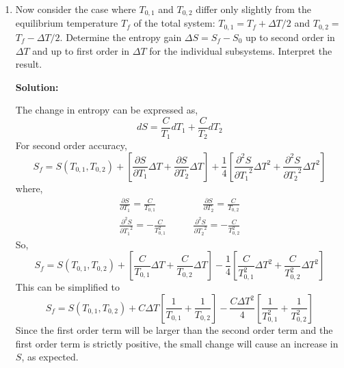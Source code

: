 \documentclass[10pt]{article}
\newenvironment{Solution}
    {\textbf{Solution:}
    
    \vspace{5mm}
    \begin{tcolorbox}
    }
    {
    \end{tcolorbox}
    \vspace{5mm}
    }
\begin{document}
\begin{enumerate}
\begin{enumerate}
\begin{Solution}
\begin{equation}
    S_a = C \ln{\frac{T_{a}^2}{T_{0,1}T_{0,2}}}
\end{equation}
\end{Solution}
\newpage

\item Now consider the case where $T_{0, 1}$ and $T_{0, 2}$ differ only slightly from the equilibrium temperature $T_{f}$ of the total system: $T_{0, 1}=T_{f}+\Delta T / 2$ and $T_{0, 2}=$ $T_{f}-\Delta T / 2 .$ Determine the entropy gain $\Delta S=S_{f}-S_{0}$ up to second order in $\Delta T$ and $\mathrm{up}$ to first order in $\Delta T$ for the individual subsystems. Interpret the result.

\begin{Solution}
The change in entropy can be expressed as,
\begin{equation}
    dS = \frac{C}{T_1}d T_1 + \frac{C}{T_2}d T_2 
\end{equation}
For second order accuracy,
\begin{equation}
    S_f = S\left(T_{0,1}, T_{0,2}\right) + \left[ \frac{\partial S}{\partial T_1} \Delta T +  \frac{\partial S}{\partial T_2} \Delta T\right] + \frac{1}{4}\left[ \frac{\partial^2 S}{{\partial T_1}^2} {\Delta T}^2 + \frac{\partial^2 S}{{\partial T_2}^2} {\Delta T}^2\right]
\end{equation}
where,
\begin{align}
    \frac{\partial S}{\partial T_1} = \frac{C}{T_{0,1}} \qquad& \qquad \frac{\partial S}{\partial T_2} = \frac{C}{T_{0,2}}\\
    \frac{\partial^2 S}{{\partial T_1}^2} = -\frac{C}{T_{0,1}^2} \quad & \quad \frac{\partial^2 S}{{\partial T_2}^2} = -\frac{C}{T_{0,2}^2}
\end{align}
So, 
\begin{equation}
    S_f = S\left(T_{0,1}, T_{0,2}\right) + \left[ \frac{C}{T_{0,1}} \Delta T +  \frac{C}{T_{0,2}} \Delta T\right] - \frac{1}{4}\left[ \frac{C}{T_{0,1}^2} {\Delta T}^2 +\frac{C}{T_{0,2}^2} {\Delta T}^2\right]
\end{equation}
This can be simplified to 
\begin{equation}
    S_f = S\left(T_{0,1}, T_{0,2}\right) + C\Delta T\left[ \frac{1}{T_{0,1}} +  \frac{1}{T_{0,2}} \right] - \frac{C{\Delta T}^2}{4}\left[ \frac{1}{T_{0,1}^2} + \frac{1}{T_{0,2}^2}\right]
\end{equation}
Since the first order term will be larger than the second order term and the first order term is strictly positive, the small change will cause an increase in $S$, as expected.
\end{Solution}


\end{enumerate}
\end{enumerate}
\end{document}
